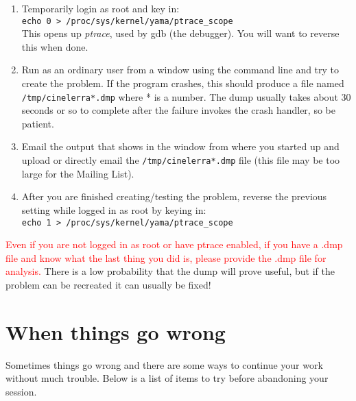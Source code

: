\begin{enumerate}[nosep]
	\item Temporarily login as root and key in:\\
	\texttt{echo 0 > /proc/sys/kernel/yama/ptrace\_scope} \\
	This opens up \textit{ptrace}, used by gdb (the debugger). You will want to reverse this when done.
	\item Run \CGG{} as an ordinary user from a window using the command line and try to create the problem. If the program crashes, this should produce a file named \texttt{/tmp/cinelerra*.dmp} where * is a number. The dump usually takes about 30 seconds or so to complete after the failure invokes the crash handler, so be patient. 
	\item Email the output that shows in the window from where you started up \CGG{} and upload or directly email the \texttt{/tmp/cinelerra*.dmp} file (this file may be too large for the Mailing List).
	\item After you are finished creating/testing the problem, reverse the previous setting while logged in as root by keying in:\\
	\texttt{echo 1 > /proc/sys/kernel/yama/ptrace\_scope}
\end{enumerate}

\textcolor{red}{Even if you are not logged in as root or have ptrace enabled, if you
have a .dmp file and know what the last thing you did is, please provide the .dmp file for analysis.} There is a low
probability that the dump will prove useful, but if the problem can be recreated it can usually be fixed!

\section{When things go wrong}%
\label{cha:when_things_go_wrong}
Sometimes things go wrong and there are some ways to continue your work without much trouble. Below is a list of items
to try before abandoning your session.

